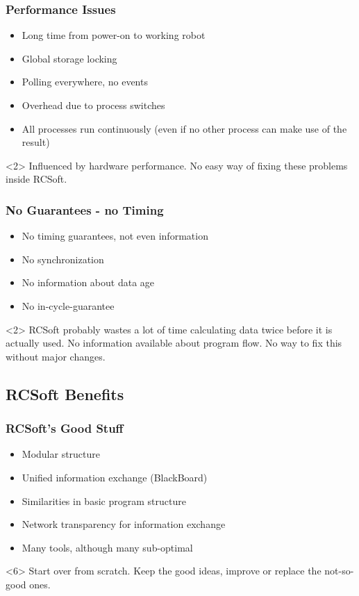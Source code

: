 \begin{frame}
  \frametitle{Performance Issues}
  \begin{itemize}
  \item Long time from power-on to working robot
  \item Global storage locking
  \item Polling everywhere, no events
  \item Overhead due to process switches
  \item All processes run continuously (even if no other process
    can make use of the result)
  \end{itemize}
  \begin{block}<2>{}
    Influenced by hardware performance. No easy way of fixing
    these problems inside RCSoft.
  \end{block}
\end{frame}

\begin{frame}
  \frametitle{No Guarantees - no Timing}
  \begin{itemize}
  \item No timing guarantees, not even information
  \item No synchronization
  \item No information about data age
  \item No in-cycle-guarantee
  \end{itemize}
  \begin{block}<2>{}
    RCSoft probably wastes a lot of time calculating data
    twice before it is actually used. No information available
    about program flow. No way to fix this without major changes.
  \end{block}
\end{frame}

\subsection{RCSoft Benefits}
\begin{frame}
  \frametitle{RCSoft's Good Stuff}
  \begin{itemize}[<+->]
  \item Modular structure
  \item Unified information exchange (BlackBoard)
  \item Similarities in basic program structure
  \item Network transparency for information exchange
  \item Many tools, although many sub-optimal
  \end{itemize}
  \begin{block}<6>{}
    Start over from scratch. Keep the good ideas, improve or replace the
    not-so-good ones.
  \end{block}
\end{frame}

